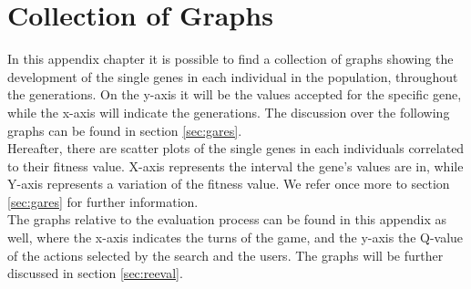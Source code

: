 \chapter{Collection of Graphs}\label{sec:genegraphs}
In this appendix chapter it is possible to find a collection of graphs showing the development of the single genes in each individual in the population, throughout the generations. On the y-axis it will be the values accepted for the specific gene, while the x-axis will indicate the generations. The discussion over the following graphs can be found in section \ref{sec:gares}.\\
Hereafter, there are scatter plots of the single genes in each individuals correlated to their fitness value. X-axis represents the interval the gene's values are in, while Y-axis represents a variation of the fitness value. We refer once more to section \ref{sec:gares} for further information.\\
The graphs relative to the evaluation process can be found in this appendix as well, where the x-axis indicates the turns of the game, and the y-axis the Q-value of the actions selected by the search and the users. The graphs will be further discussed in section \ref{sec:reeval}.\\
\newpage
